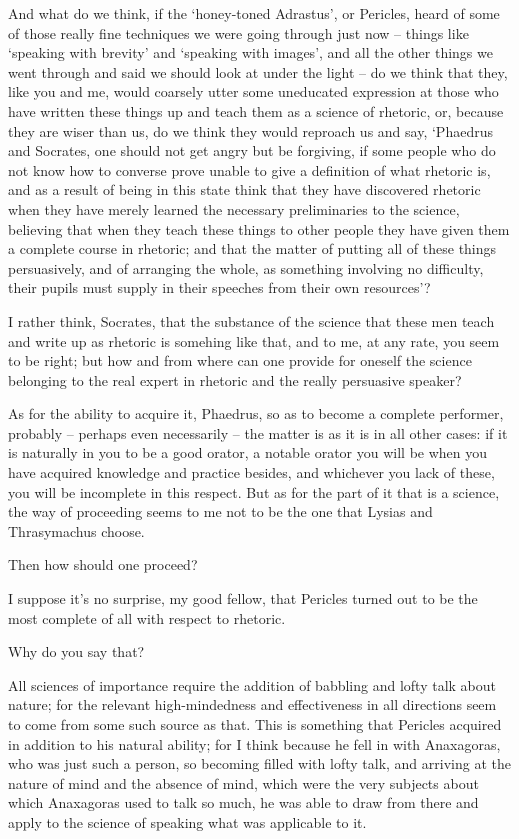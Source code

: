  And what do we think, if the ‘honey-toned Adrastus',
or Pericles, heard of
some of those really fine techniques we were going through just now --
things like ‘speaking with brevity' and ‘speaking with images', and all
the other things we went through and said we should look at under the
 light -- do we think that they, like you and me, would coarsely
utter some uneducated expression at those who have written these things
up and teach them as a science of rhetoric, or, because they are wiser
than us, do we think they would  reproach us and say, ‘Phaedrus
and Socrates, one should not get angry but be forgiving, if some people
who do not know how to
converse prove unable to
give a definition of what rhetoric is, and as a result of being in this
state think that they have discovered rhetoric when they have merely
learned the necessary preliminaries to the science, believing that when
they  teach these things to other people they have given them a
complete course in rhetoric; and that the matter of putting all of these
things persuasively, and of arranging the whole, as something involving
no difficulty, their pupils must supply in their speeches from their own
resources'? 

I rather think, Socrates, that the substance of the science
that these men teach and write up as rhetoric is somehing like that, and
to me, at any rate, you seem to be right; but how and from where can one
provide for oneself the science  belonging to the real expert in
rhetoric and the really persuasive speaker?

As for the ability to acquire it, Phaedrus, so as to become a
complete performer, probably -- perhaps even necessarily -- the matter
is as it is in all other cases: if it is naturally in you to be a good
orator, a notable orator you will be when you have acquired knowledge
and practice besides,  and whichever you lack of these, you will
be incomplete in this respect. But as for the part of it that is a
science, the way of proceeding seems to me not to be the one that Lysias
and Thrasymachus choose.

Then how should one proceed?

I suppose it's no surprise, my good fellow, that 
Pericles turned out to be the most complete of all with respect to
rhetoric.

Why do you say that?

All sciences of importance require the addition of 
babbling and lofty talk
about nature; for the relevant high-mindedness and effectiveness in all
directions seem to come from some such source as that. This is something
that Pericles acquired in addition to his natural ability; for I think
because he fell in with Anaxagoras, who was just such a person, so
becoming filled with lofty talk, and arriving at the nature of 
mind and the absence of mind, which were the very subjects about which
Anaxagoras used to talk
so much, he was able to draw from there and apply to the science of
speaking what was applicable to it.

